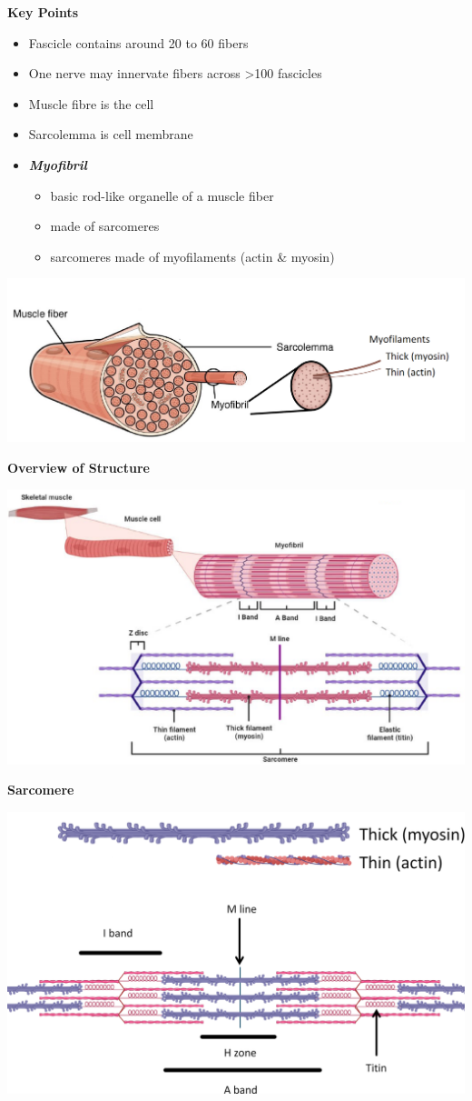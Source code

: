 \documentclass[11pt,fleqn]{book} %
\begin{document}
\textbf{Key Points}
\begin{itemize}
    \item Fascicle contains around 20 to 60 fibers
    \item One nerve may innervate fibers across >100 fascicles
    \item Muscle fibre is the cell
    \item Sarcolemma is cell membrane
    \item \textbf{\textit{Myofibril}}
    \begin{itemize}
        \item basic rod-like organelle of a muscle fiber
        \item made of sarcomeres
        \item sarcomeres made of myofilaments (actin \& myosin)
    \end{itemize}
\end{itemize}
\begin{center}
    \includegraphics[width=0.65\linewidth]{Pictures/Screenshot 2024-04-03 005053.png}
\end{center}
\textbf{Overview of Structure}
\begin{center}
    \includegraphics[width=0.65\linewidth]{Pictures/Screenshot 2024-04-03 005340.png}
\end{center}
\textbf{Sarcomere}
\begin{center}
    \includegraphics[width=0.65\linewidth]{Pictures/Screenshot 2024-04-03 005431.png}
\end{center}
\end{document}
